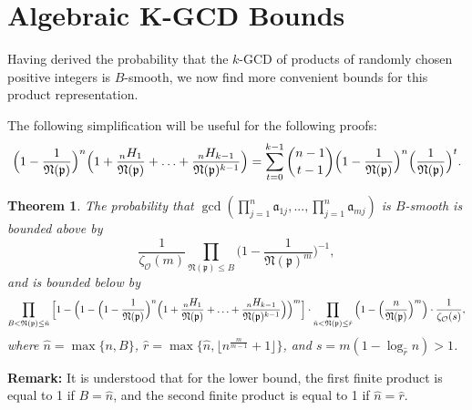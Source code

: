 \documentclass[10pt,a4paper]{article}
\newtheorem{theorem}{Theorem}
\newcommand{\f}[1]{\mathfrak{#1}}
\begin{document}
	\section{Algebraic K-GCD Bounds}
	Having derived the probability that the $k$-GCD of products of randomly chosen positive integers is $B$-smooth, we now find more convenient bounds for this product representation.\newline
	
	The following simplification will be useful for the following proofs:
	\begin{align*}
		\Big(1-\frac{1}{\f{N}(\f{p})}\Big)^n\Big(1+\frac{{}_nH_1}{\f{N}(\f{p})}+\mathellipsis+\frac{{}_nH_{k-1}}{\f{N}(\f{p})^{k-1}}\Big) = \sum_{t=0}^{k-1}\binom{n-1}{t-1}\Big(1-\frac{1}{\f{N}(\f{p})}\Big)^n\Big(\frac{1}{\f{N}(\f{p})}\Big)^t.
	\end{align*}
	
	\begin{theorem} The probability that $\gcd(\prod_{j=1}^n \f{a}_{1j}, ..., \prod_{j=1}^{n}\f{a}_{mj})$ is $B$-smooth is bounded above by 
		$$\frac{1}{\zeta_\mathcal{O}(m)}\prod_{\f{N}(\f{p})\leq B}\Big(1-\frac{1}{\f{N}(\f{p})^m}\Big)^{-1},$$
		and is bounded below by 
		$$\prod_{B<\f{N}(\f{p})\leq\hat{n}} \Big[1 - \Big(1 -\Big(1-\frac{1}{\f{N}(\f{p})}\Big)^n\Big(1+\frac{{}_nH_1}{\f{N}(\f{p})}+\mathellipsis+\frac{{}_nH_{k-1}}{\f{N}(\f{p})^{k-1}}\Big)\Big)^m\Big] \cdot \prod_{\hat{n}<\f{N}(\f{p})\leq\hat{r}} \Big(1 - \Big(\frac{n}{\f{N}(\f{p})}\Big)^m\Big) \cdot \frac{1}{\zeta_\mathcal{O}(s)},$$
		where $\hat{n}=\max\{n,B\}$, $\hat{r}=\max\{\hat{n}, \lfloor n^{\frac{m}{m-1}}+1\rfloor\}$, and $s = m(1 - \log_{\hat{r}}{n}) > 1$.
	\end{theorem} 
	
	\noindent \textbf{Remark:} It is understood that for the lower bound, the first finite product is equal to 1 if $B = \hat{n}$, and the second finite product is equal to 1 if $\hat{n}=\hat{r}$.
	\newline
	
\end{document}
